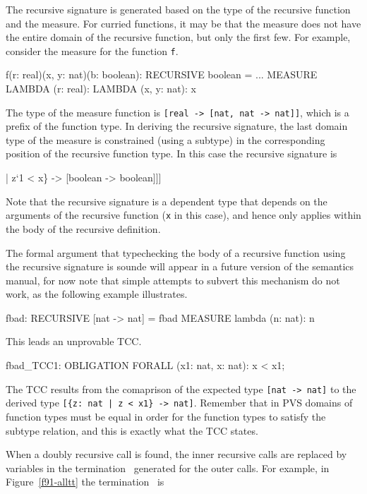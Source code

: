 The recursive signature is generated based on the type of the recursive
function and the measure.  For curried functions, it may be that the
measure does not have the entire domain of the recursive function, but
only the first few.  For example, consider the measure for the function
\texttt{f}.
\begin{pvsex}
  f(r: real)(x, y: nat)(b: boolean): RECURSIVE boolean
    = ...
   MEASURE LAMBDA (r: real): LAMBDA (x, y: nat): x
\end{pvsex}
The type of the measure function is \texttt{[real -> [nat, nat -> nat]]},
which is a prefix of the function type.  In deriving the recursive
signature, the last domain type of the measure is constrained (using a
subtype) in the corresponding position of the recursive function type.  In
this case the recursive signature is
\begin{pvsex}
  [real -> [\{z: [nat, nat] | z`1 < x\} -> [boolean -> boolean]]]
\end{pvsex}
Note that the recursive signature is a dependent type that depends on the
arguments of the recursive function (\texttt{x} in this case), and hence
only applies within the body of the recursive definition.

The formal argument that typechecking the body of a recursive function
using the recursive signature is sounde will appear in a future version of
the semantics manual, for now note that simple attempts to subvert this
mechanism do not work, as the following example illustrates.
\begin{pvsex}
  fbad: RECURSIVE [nat -> nat] = fbad
   MEASURE lambda (n: nat): n
\end{pvsex}
This leads an unprovable TCC.
\begin{pvsex}
  fbad_TCC1: OBLIGATION FORALL (x1: nat, x: nat): x < x1;
\end{pvsex}
The TCC results from the comaprison of the expected type \texttt{[nat ->
nat]} to the derived type \texttt{[\{z:\ nat | z < x1\} -> nat]}.  Remember
that in PVS domains of function types must be equal in order for the
function types to satisfy the subtype relation, and this is exactly what
the TCC states.


When a doubly recursive call is found, the inner recursive calls are
replaced by variables in the termination \tccs\ generated for the outer
calls.  For example, in Figure~\ref{f91-alltt} the termination \tcc\ is

